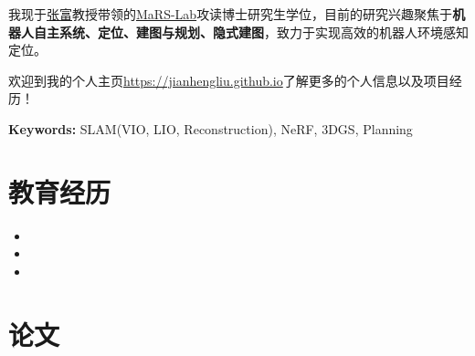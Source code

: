 \documentclass[11pt,a4paper,sans]{moderncv}        %
\begin{document}
\makecvtitle

{我现于\href{https://mars.hku.hk/}{张富}教授带领的\href{https://mars.hku.hk/}{MaRS-Lab}攻读博士研究生学位，目前的研究兴趣聚焦于\textbf{机器人自主系统、定位、建图与规划、隐式建图}，致力于实现高效的机器人环境感知定位。

欢迎到我的个人主页\href{https://jianhengliu.github.io}{https://jianhengliu.github.io}了解更多的个人信息以及项目经历！
}

\textbf{Keywords:} SLAM(VIO, LIO, Reconstruction), NeRF, 3DGS, Planning

\section{教育经历}

\begin{itemize}

\item{}

\item{}

\item{}

\end{itemize}

\vspace{2pt}

\section{论文}
\end{document}
